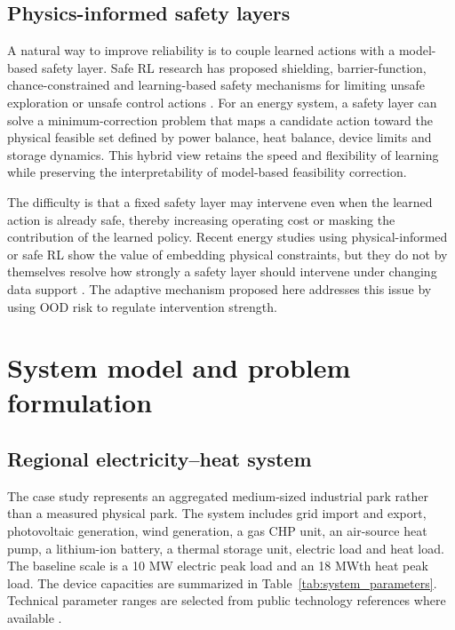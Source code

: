 \documentclass[preprint,12pt]{elsarticle}
\begin{document}
\subsection{Physics-informed safety layers}

A natural way to improve reliability is to couple learned actions with a model-based safety layer. Safe RL research has proposed shielding, barrier-function, chance-constrained and learning-based safety mechanisms for limiting unsafe exploration or unsafe control actions \cite{Garcia2015SafeRL,Brunke2022SafeLearningRobotics,Cheng2019SafeRLBarrierFunctions,Zhang2022SafeChanceConstrainedRL}. For an energy system, a safety layer can solve a minimum-correction problem that maps a candidate action toward the physical feasible set defined by power balance, heat balance, device limits and storage dynamics. This hybrid view retains the speed and flexibility of learning while preserving the interpretability of model-based feasibility correction.

The difficulty is that a fixed safety layer may intervene even when the learned action is already safe, thereby increasing operating cost or masking the contribution of the learned policy. Recent energy studies using physical-informed or safe RL show the value of embedding physical constraints, but they do not by themselves resolve how strongly a safety layer should intervene under changing data support \cite{Yang2023PhysicalInformedSafeRL,Li2025SafeDRLBuildingEnergy}. The adaptive mechanism proposed here addresses this issue by using OOD risk to regulate intervention strength.



\section{System model and problem formulation}

\subsection{Regional electricity--heat system}

The case study represents an aggregated medium-sized industrial park rather than a measured physical park. The system includes grid import and export, photovoltaic generation, wind generation, a gas CHP unit, an air-source heat pump, a lithium-ion battery, a thermal storage unit, electric load and heat load. The baseline scale is a 10 MW electric peak load and an 18 MWth heat peak load. The device capacities are summarized in Table~\ref{tab:system_parameters}. Technical parameter ranges are selected from public technology references where available \cite{EPA2015CHP,NREL2024BatteryATB}.
\end{document}
